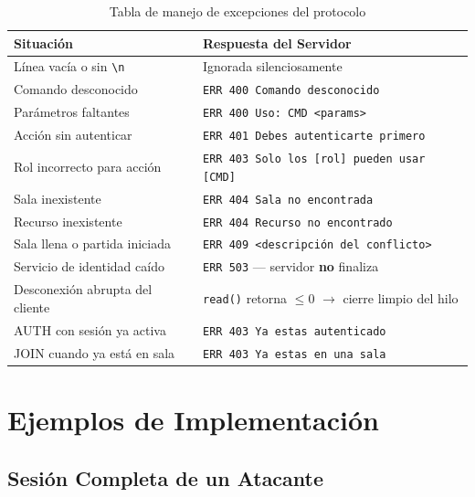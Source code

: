 \documentclass[12pt, letterpaper]{article}
\begin{document}
\begin{table}[H]
\centering
\begin{tabularx}{\textwidth}{X X}
\toprule
\textbf{Situación} & \textbf{Respuesta del Servidor} \\
\midrule
Línea vacía o sin \texttt{\textbackslash{}n} & Ignorada silenciosamente \\
Comando desconocido & \texttt{ERR 400 Comando desconocido} \\
Parámetros faltantes & \texttt{ERR 400 Uso: CMD <params>} \\
Acción sin autenticar & \texttt{ERR 401 Debes autenticarte primero} \\
Rol incorrecto para acción & \texttt{ERR 403 Solo los [rol] pueden usar [CMD]} \\
Sala inexistente & \texttt{ERR 404 Sala no encontrada} \\
Recurso inexistente & \texttt{ERR 404 Recurso no encontrado} \\
Sala llena o partida iniciada & \texttt{ERR 409 <descripción del conflicto>} \\
Servicio de identidad caído & \texttt{ERR 503} --- servidor \textbf{no} finaliza \\
Desconexión abrupta del cliente & \texttt{read()} retorna $\leq 0$ $\rightarrow$ cierre limpio del hilo \\
AUTH con sesión ya activa & \texttt{ERR 403 Ya estas autenticado} \\
JOIN cuando ya está en sala & \texttt{ERR 403 Ya estas en una sala} \\
\bottomrule
\end{tabularx}
\caption{Tabla de manejo de excepciones del protocolo}
\end{table}

\section{Ejemplos de Implementación}

\subsection{Sesión Completa de un Atacante}
\end{document}
